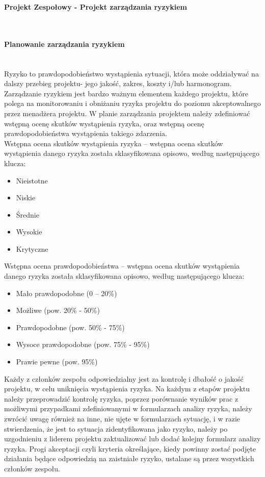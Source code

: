 \documentclass{article}
\begin{document}
\begin{center}
\textbf{Projekt Zespołowy - Projekt zarządzania ryzykiem}
\end{center}
\mbox{}\\
\paragraph{Planowanie zarządzania ryzykiem}
\mbox{}\\

Ryzyko to prawdopodobieństwo wystąpienia sytuacji, która może oddziaływać na dalszy przebieg projektu- jego jakość, zakres, koszty i/lub harmonogram.
Zarządzanie ryzykiem jest bardzo ważnym elementem każdego projektu, które polega na monitorowaniu i obniżaniu ryzyka projektu do poziomu akceptowalnego przez menadżera projektu.
W planie zarządzania projektem należy zdefiniować wstępną ocenę skutków wystąpienia ryzyka, oraz wstępną ocenę prawdopodobieństwa wystąpienia takiego zdarzenia.
\mbox{}\\

Wstępna ocena skutków wystąpienia ryzyka – wstępna ocena skutków wystąpienia danego ryzyka została sklasyfikowana opisowo, według następującego klucza:
\begin{itemize}
\item{Nieistotne}
\item{Niskie}
\item{Średnie}
\item{Wysokie}
\item{Krytyczne}
\end{itemize}

Wstępna ocena prawdopodobieństwa – wstępna ocena skutków wystąpienia danego ryzyka została sklasyfikowana opisowo, według następującego klucza:
\begin{itemize}
\item{Mało prawdopodobne (0 – 20\%)}
\item{Możliwe (pow. 20\% - 50\%)}
\item{Prawdopodobne (pow. 50\% - 75\%)}
\item{Wysoce prawdopodobne (pow. 75\% - 95\%)}
\item{Prawie pewne (pow. 95\%)}
\end{itemize}


Każdy z członków zespołu odpowiedzialny jest za kontrolę i dbałość o jakość projektu, w celu uniknięcia wystąpienia ryzyka.  
Na każdym z etapów projektu należy przeprowadzić kontrolę ryzyka, poprzez porównanie wyników prac z możliwymi przypadkami zdefiniowanymi w formularzach analizy ryzyka, należy zwrócić uwagę również na inne, nie ujęte w formularzach sytuację, i w razie stwierdzenia, że jest to sytuacja zidentyfikowana jako ryzyko, należy po uzgodnieniu z liderem projektu zaktualizować lub dodać kolejny formularz analizy ryzyka. 
Progi akceptacji czyli kryteria określające, kiedy powinny zostać podjęte działania będące odpowiedzią na zaistniałe ryzyko, ustalane są przez wszystkich członków zespołu.
\end{document}
